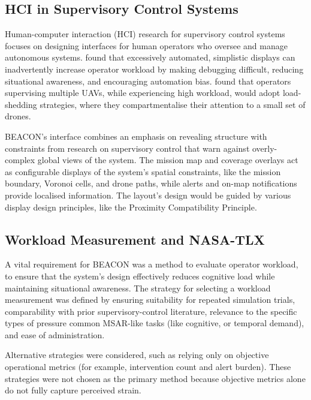 \subsection{HCI in Supervisory Control Systems}\label{subsec:supervisory-hci}

Human-computer interaction (HCI) research for supervisory control systems focuses on designing interfaces for human operators who oversee and manage autonomous systems.
\cite{AUTOMATIONEFFECTONUAVROUTING} found that excessively automated, simplistic displays can inadvertently increase operator workload by making debugging difficult, reducing situational awareness, and encouraging automation bias.
\cite{CUMMINGS2007339} found that operators supervising multiple UAVs, while experiencing high workload, would adopt load-shedding strategies, where they compartmentalise their attention to a small set of drones.

BEACON's interface combines an emphasis on revealing structure with constraints from research on supervisory control that warn against overly-complex global views of the system.
The mission map and coverage overlays act as configurable displays of the system's spatial constraints, like the mission boundary, Voronoi cells, and drone paths, while alerts and on-map notifications provide localised information.
The layout's design would be guided by various display design principles, like the Proximity Compatibility Principle.

\subsection{Workload Measurement and NASA-TLX}\label{subsec:workload-measurement-and-nasa-tlx}

A vital requirement for BEACON was a method to evaluate operator workload, to ensure that the system's design effectively reduces cognitive load while maintaining situational awareness.
The strategy for selecting a workload measurement was defined by ensuring suitability for repeated simulation trials, comparability with prior supervisory-control literature, relevance to the specific types of pressure common MSAR-like tasks (like cognitive, or temporal demand), and ease of administration.

Alternative strategies were considered, such as relying only on objective operational metrics (for example, intervention count and alert burden).
These strategies were not chosen as the primary method because objective metrics alone do not fully capture perceived strain.

